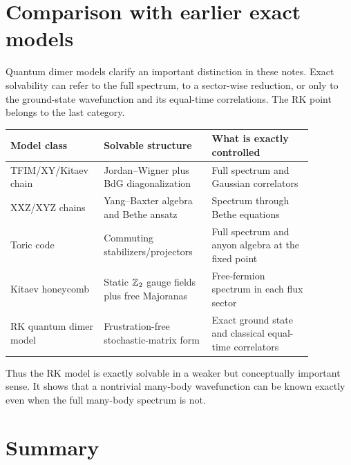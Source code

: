 \section{Comparison with earlier exact models}
\label{sec:qdm-comparison-with-earlier-models}

Quantum dimer models clarify an important distinction in these notes.  Exact
solvability can refer to the full spectrum, to a sector-wise reduction, or only
to the ground-state wavefunction and its equal-time correlations.  The RK point
belongs to the last category.

\begin{center}
\small
\begin{tabular}{L{0.23\linewidth}L{0.33\linewidth}L{0.31\linewidth}}
\toprule
Model class & Solvable structure & What is exactly controlled \\
\midrule
TFIM/XY/Kitaev chain & Jordan--Wigner plus BdG diagonalization & Full spectrum and Gaussian correlators \\
XXZ/XYZ chains & Yang--Baxter algebra and Bethe ansatz & Spectrum through Bethe equations \\
Toric code & Commuting stabilizers/projectors & Full spectrum and anyon algebra at the fixed point \\
Kitaev honeycomb & Static \(\mathbb{Z}_2\) gauge fields plus free Majoranas & Free-fermion spectrum in each flux sector \\
RK quantum dimer model & Frustration-free stochastic-matrix form & Exact ground state and classical equal-time correlators \\
\bottomrule
\end{tabular}
\end{center}

Thus the RK model is exactly solvable in a weaker but conceptually important
sense.  It shows that a nontrivial many-body wavefunction can be known exactly
even when the full many-body spectrum is not.

\section{Summary}
\label{sec:qdm-summary}

